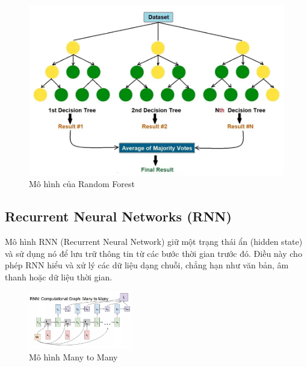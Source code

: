 \documentclass[conference]{IEEEtran}
\begin{document}
\begin{figure} [H]
    \centering
    \begin{minipage}{0.3\textwidth}
    \includegraphics[width=1\textwidth]{bibliography/pictures/RandomForest.jpg}
    \caption{Mô hình của Random Forest}
    \end{minipage}  
\end{figure}

\subsection{Recurrent Neural Networks (RNN)} 
Mô hình RNN (Recurrent Neural Network) giữ một trạng thái ẩn (hidden state) và sử dụng nó để lưu trữ thông tin từ các bước thời gian trước đó. Điều này cho phép RNN hiểu và xử lý các dữ liệu dạng chuỗi, chẳng hạn như văn bản, âm thanh hoặc dữ liệu thời gian.

\begin{figure}[H]
    \centering
    \includegraphics[width=0.4\textwidth]{bibliography/pictures/RNN.jpg}
    \caption{Mô hình Many to Many}
\end{figure}
\end{document}
